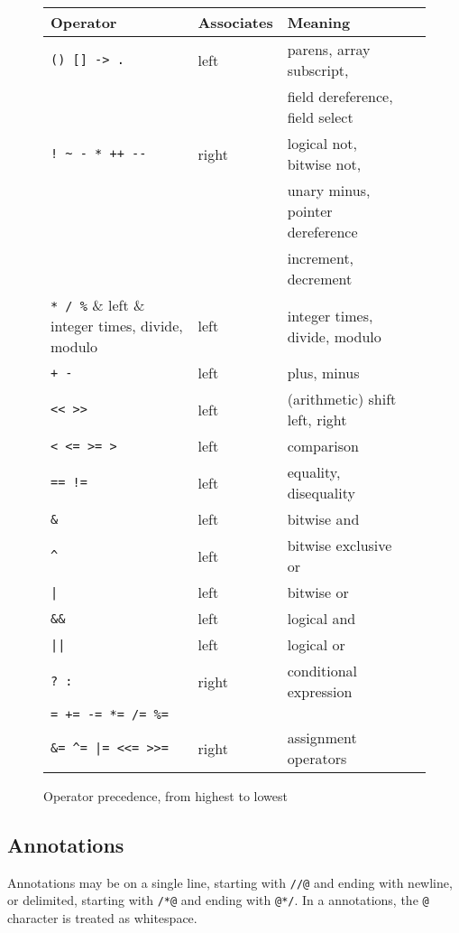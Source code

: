 \documentclass[11pt]{article}
\begin{document}
\begin{figure}
\begin{small}
\renewcommand{\arraystretch}{1.25}
\begin{tabular}{llll}
\hline
Operator & Associates & Meaning \\
\hline
\verb'() [] -> .'       & left  & parens, array subscript,\\
                        &       & field dereference, field select \\
\verb'! ~ - * ++ --'    & right & logical not, bitwise not, \\
                        &       & unary minus, pointer dereference \\
                        &       & increment, decrement \\
\verb'* / %'            & left  & integer times, divide, modulo \\
\verb'+ -'              & left  & plus, minus \\
\verb'<< >>'            & left  & (arithmetic) shift left, right\\
\verb'< <= >= >'        & left  & comparison \\
\verb'== !='            & left  & equality, disequality \\
\verb'&'                & left  & bitwise and \\
\verb'^'                & left  & bitwise exclusive or \\
\verb'|'                & left  & bitwise or \\
\verb'&&'               & left  & logical and \\
\verb'||'               & left  & logical or \\
\verb'? :'              & right & conditional expression \\
\verb'= += -= *= /= %=' \\
\hspace{3em}\verb'&= ^= |= <<= >>=' & right & assignment operators \\
\hline
\end{tabular}
\end{small}
\caption{Operator precedence, from highest to lowest}
\label{fig:precedence}
\end{figure}

\subsection{Annotations}

Annotations may be on a single line, starting with
\verb'//@' and ending with newline, or delimited,
starting with \verb'/*@' and ending with \verb'@*/'.
In a annotations, the \verb'@' character is treated
as whitespace.
\end{document}
